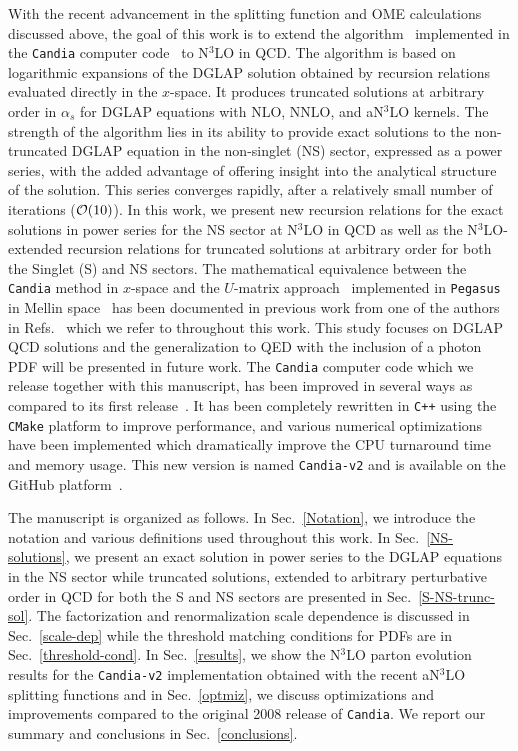 \documentclass[12pt,notitlepage,aps,preprintnumbers,superscriptaddress,nofootinbib,aps,prd,floatfix]{revtex4-2}
\begin{document}
With the recent advancement in the splitting function and OME calculations discussed above, the goal of this work is to extend the algorithm~\cite{Cafarella:2005zj,Guzzi:2006wx} implemented in the \texttt{Candia} computer code~\cite{Cafarella:2008du,candiav1} to N$^3$LO in QCD. The algorithm is based on logarithmic expansions of the DGLAP solution obtained by recursion relations evaluated directly in the $x$-space. It produces truncated solutions at arbitrary order in $\alpha_s$ for DGLAP equations with NLO, NNLO, and aN$^3$LO kernels.  
The strength of the algorithm lies in its ability to provide exact solutions to the non-truncated DGLAP equation in the non-singlet (NS) sector, expressed as a power series, with the added advantage of offering insight into the analytical structure of the solution. This series converges rapidly, after a relatively small number of iterations (${\cal O}(10)$). In this work, we present new recursion relations for the exact solutions in power series for the NS sector at N$^3$LO in QCD as well as the N$^3$LO-extended recursion relations for truncated solutions at arbitrary order for both the Singlet (S) and NS sectors. 
The mathematical equivalence between the \texttt{Candia} method in $x$-space and the $U$-matrix approach~\cite{Furmanski:1981cw} implemented in \texttt{Pegasus} in Mellin space~\cite{Vogt:2004ns} has been documented in previous work from one of the authors in Refs.~\cite{Cafarella:2005zj,Cafarella:2008du,Guzzi_2006} which we refer to throughout this work.
This study focuses on DGLAP QCD solutions and the generalization to QED with the inclusion of a photon PDF will be presented in future work. 
The \texttt{Candia} computer code which we release together with this manuscript, has been improved in several ways as compared to its first release~\cite{Cafarella:2008du}. It has been completely rewritten in \texttt{C++} using the \texttt{CMake} platform to improve performance, and various numerical optimizations have been implemented which dramatically improve the CPU turnaround time and memory usage. This new version is named \texttt{Candia-v2} and is available on the GitHub platform~\cite{candiav2}.

The manuscript is organized as follows. In Sec.~\ref{Notation}, we introduce the notation and various definitions used throughout this work. In Sec.~\ref{NS-solutions}, we present an exact solution in power series to the DGLAP equations in the NS sector while truncated solutions, extended to arbitrary perturbative order in QCD for both the S and NS sectors are presented in Sec.~\ref{S-NS-trunc-sol}.
The factorization and renormalization scale dependence is discussed in Sec.~\ref{scale-dep} while the threshold matching conditions for PDFs are in Sec.~\ref{threshold-cond}. In Sec.~\ref{results}, we show the N$^3$LO parton evolution results for the \texttt{Candia-v2} implementation obtained with the recent aN$^3$LO splitting functions and in Sec.~\ref{optmiz}, we discuss optimizations and improvements compared to the original 2008 release of \texttt{Candia}. We report our summary and conclusions in Sec.~\ref{conclusions}.
\end{document}
